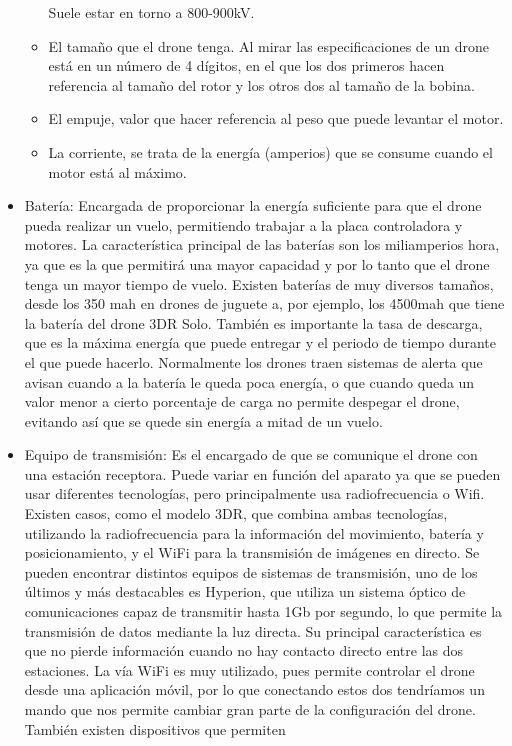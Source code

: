 \begin{itemize}
\begin{itemize}
Suele estar en torno a 800-900kV.
	\item El tamaño que el drone tenga. Al mirar las especificaciones de un drone está en
un número de 4 dígitos, en el que los dos primeros hacen referencia al tamaño
del rotor y los otros dos al tamaño de la bobina.
	\item El empuje, valor que hacer referencia al peso que puede levantar el motor.
	\item La corriente, se trata de la energía (amperios) que se consume cuando el motor
está al máximo.
	\end{itemize}
\item Batería: Encargada de proporcionar la energía suficiente para que el drone
pueda realizar un vuelo, permitiendo trabajar a la placa controladora y motores. La
característica principal de las baterías son los miliamperios hora, ya que es la que
permitirá una mayor capacidad y por lo tanto que el drone tenga un mayor tiempo
de vuelo. Existen baterías de muy diversos tamaños, desde los 350 mah en drones de
juguete a, por ejemplo, los 4500mah que tiene la batería del drone 3DR Solo. También
es importante la tasa de descarga, que es la máxima energía que puede entregar y el
periodo de tiempo durante el que puede hacerlo. Normalmente los drones traen sistemas
de alerta que avisan cuando a la batería le queda poca energía, o que cuando queda
un valor menor a cierto porcentaje de carga no permite despegar el drone, evitando así
que se quede sin energía a mitad de un vuelo.
\item Equipo de transmisión: Es el encargado de que se comunique el drone con
una estación receptora. Puede variar en función del aparato ya que se pueden usar
diferentes tecnologías, pero principalmente usa radiofrecuencia o Wifi. Existen casos,
como el modelo 3DR, que combina ambas tecnologías, utilizando la radiofrecuencia
para la información del movimiento, batería y posicionamiento, y el WiFi para la
transmisión de imágenes en directo. Se pueden encontrar distintos equipos de sistemas
de transmisión, uno de los últimos y más destacables es Hyperion, que utiliza un
sistema óptico de comunicaciones capaz de transmitir hasta 1Gb por segundo, lo que
permite la transmisión de datos mediante la luz directa. Su principal característica
es que no pierde información cuando no hay contacto directo entre las dos estaciones.
La vía WiFi es muy utilizado, pues permite controlar el drone desde una aplicación
móvil, por lo que conectando estos dos tendríamos un mando que nos permite cambiar
gran parte de la configuración del drone. También existen dispositivos que permiten

\end{itemize}
